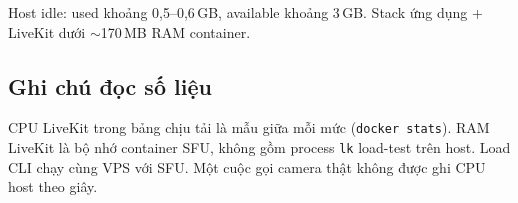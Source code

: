 Host idle: used khoảng 0{,}5--0{,}6\,GB, available khoảng 3\,GB. Stack ứng dụng + LiveKit
dưới $\sim$170\,MB RAM container.

\subsection{Ghi chú đọc số liệu}

CPU LiveKit trong bảng chịu tải là mẫu giữa mỗi mức (\texttt{docker stats}). RAM LiveKit
là bộ nhớ container SFU, không gồm process \texttt{lk} load-test trên host. Load CLI chạy
cùng VPS với SFU. Một cuộc gọi camera thật không được ghi CPU host theo giây.
